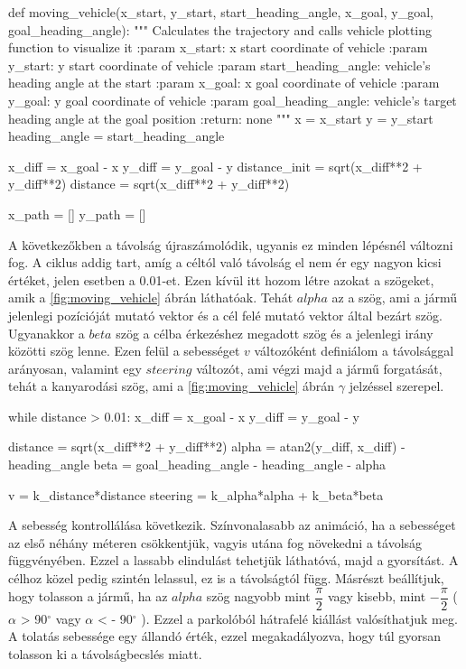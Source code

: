 \begin{python}
def moving_vehicle(x_start, y_start, start_heading_angle, x_goal,
 y_goal, goal_heading_angle):
    """
    Calculates the trajectory and calls vehicle plotting
    function to visualize it
    :param x_start: x start coordinate of vehicle
    :param y_start: y start coordinate of vehicle
    :param start_heading_angle: vehicle's heading angle at the start
    :param x_goal: x goal coordinate of vehicle
    :param y_goal: y goal coordinate of vehicle
    :param goal_heading_angle: vehicle's target heading angle
    at the goal position
    :return: none
    """
    x = x_start
    y = y_start
    heading_angle = start_heading_angle

    x_diff = x_goal - x
    y_diff = y_goal - y
    distance_init = sqrt(x_diff**2 + y_diff**2)
    distance = sqrt(x_diff**2 + y_diff**2)

    x_path = []
    y_path = []
\end{python}

\bigskip

A következőkben a távolság újraszámolódik, ugyanis ez minden lépésnél változni fog. A ciklus addig tart, amíg a céltól való távolság el nem ér egy nagyon kicsi értéket, jelen esetben a 0.01-et. Ezen kívül itt hozom létre azokat a szögeket, amik a \ref{fig:moving_vehicle} ábrán láthatóak. Tehát $ alpha $ az a szög, ami a jármű jelenlegi pozícióját mutató vektor és a cél felé mutató vektor által bezárt szög. Ugyanakkor a $ beta $ szög a célba érkezéshez megadott szög és a jelenlegi irány közötti szög lenne. Ezen felül a sebességet $ v $ változóként definiálom a távolsággal arányosan, valamint egy $ steering $ változót, ami végzi majd a jármű forgatását, tehát a kanyarodási szög, ami a \ref{fig:moving_vehicle} ábrán $ \gamma $ jelzéssel szerepel.

\begin{python}
while distance > 0.01:
        x_diff = x_goal - x
        y_diff = y_goal - y

        distance = sqrt(x_diff**2 + y_diff**2)
        alpha = atan2(y_diff, x_diff) - heading_angle
        beta = goal_heading_angle - heading_angle - alpha

        v = k_distance*distance
        steering = k_alpha*alpha + k_beta*beta
\end{python}

\bigskip

A sebesség kontrollálása következik. Színvonalasabb az animáció, ha a sebességet az első néhány méteren csökkentjük, vagyis utána fog növekedni a távolság függvényében. Ezzel a lassabb elindulást tehetjük láthatóvá, majd a gyorsítást. A célhoz közel pedig szintén lelassul, ez is a távolságtól függ. Másrészt beállítjuk, hogy tolasson a jármű, ha az $ alpha $ szög nagyobb mint $ \dfrac{\pi}{2} $ vagy kisebb, mint $ -\dfrac{\pi}{2} $ ( $ \alpha $ > 90$^{\circ}$ vagy $ \alpha $ < - 90$^{\circ}$ ). Ezzel a parkolóból hátrafelé kiállást valósíthatjuk meg. A tolatás sebessége egy állandó érték, ezzel megakadályozva, hogy túl gyorsan tolasson ki a távolságbecslés miatt.

